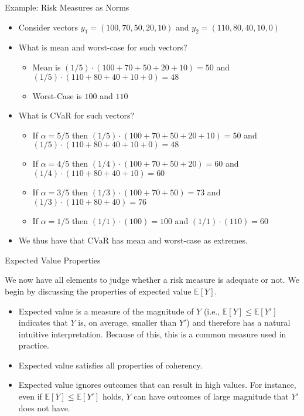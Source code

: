 \documentclass[9pt]{beamer}
\begin{document}
%
\begin{frame}{Example: Risk Measures as Norms}

\begin{itemize}
\item Consider vectors $y_1=(100,70,50,20,10)$ and $y_2=(110,80,40,10,0)$

\item What is mean and worst-case for such vectors?
\begin{itemize}
\item Mean is $(1/5)\cdot (100+70+50+20+10)=50$ and $(1/5)\cdot(110+80+40+10+0)=48$
\item Worst-Case is $100$ and $110$
\end{itemize}
\item What is CVaR for such vectors? 
\begin{itemize}
\item If $\alpha=5/5$ then $(1/5)\cdot (100+70+50+20+10)=50$ and $(1/5)\cdot(110+80+40+10+0)=48$
\item If $\alpha=4/5$ then $(1/4)\cdot (100+70+50+20)=60$ and $(1/4)\cdot(110+80+40+10)=60$
\item If $\alpha=3/5$ then $(1/3)\cdot (100+70+50)=73$ and $(1/3)\cdot(110+80+40)=76$
\item If $\alpha=1/5$ then $(1/1)\cdot (100)=100$ and $(1/1)\cdot(110)=60$
\end{itemize}
\item We thus have that CVaR has mean and worst-case as extremes.
\end{itemize}


\end{frame}

%
\begin{frame}{Expected Value Properties}

We now have all elements to judge whether a risk measure is adequate or not.  We begin by discussing the properties of expected value $\mathbb{E}[Y]$.

\begin{itemize}
\item Expected value is a measure of the magnitude of $Y$ (i.e., $\mathbb{E}[Y]\leq \mathbb{E}[Y']$ indicates that $Y$ is, on average, smaller than $Y'$) and therefore has a natural intuitive interpretation.  Because of this, this is a common measure used in practice. 

\item Expected value satisfies all properties of coherency. 

\item Expected value ignores outcomes that can result in high values. For instance, even if $\mathbb{E}[Y]\leq \mathbb{E}[Y']$ holds, $Y$ can have outcomes of large magnitude that $Y'$ does not have. 

\end{itemize}


\end{frame}
\end{document}
